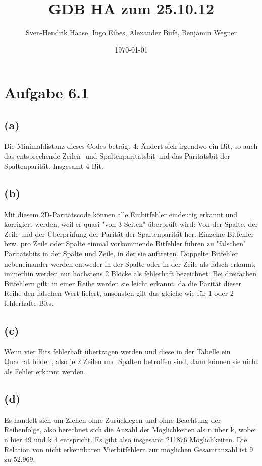 \documentclass[12pt]{article}
\author{Sven-Hendrik Haase, Ingo Eibes, Alexander Bufe, Benjamin Wegner}
\title{GDB HA zum 25.10.12}
\date{\today}
\begin{document}
\setcounter{secnumdepth}{0}
\maketitle

\section{Aufgabe 6.1}
\subsection{(a)}
Die Minimaldistanz dieses Codes beträgt 4:
Ändert sich irgendwo ein Bit, so auch das entsprechende Zeilen-
und Spaltenparitätsbit und das Paritätsbit der Spaltenparität.
Insgesamt 4 Bit.

\subsection{(b)}
Mit diesem 2D-Paritätscode können alle Einbitfehler eindeutig
erkannt und korrigiert werden, weil er quasi "von 3 Seiten"
überprüft wird:
Von der Spalte, der Zeile und der Überprüfung der
Parität der Spaltenparität her.
Einzelne Bitfehler bzw. pro Zeile oder Spalte einmal vorkommende 
Bitfehler führen zu "falschen" Paritätsbits in der Spalte und Zeile,
in der sie auftreten.
Doppelte Bitfehler nebeneinander werden entweder in der Spalte
oder in der Zeile als falsch erkannt; immerhin werden nur
höchstens 2 Blöcke als fehlerhaft bezeichnet.
Bei dreifachen Bitfehlern gilt: in einer Reihe werden sie leicht
erkannt, da die Parität dieser Reihe den falschen Wert liefert,
ansonsten gilt das gleiche wie für 1 oder 2 fehlerhafte Bits.

\subsection{(c)}
Wenn vier Bits fehlerhaft übertragen werden und diese in
der Tabelle ein Quadrat bilden, also je 2 Zeilen und Spalten
betroffen sind, dann können sie nicht als Fehler erkannt werden.

\subsection{(d)}
Es handelt sich um Ziehen ohne Zurücklegen und ohne
Beachtung der Reihenfolge, also berechnet sich die Anzahl
der Möglichkeiten als n über k, wobei n hier 49
und k 4 entspricht.
Es gibt also insgesamt 211876 Möglichkeiten.
Die Relation von nicht erkennbaren Vierbitfehlern zur möglichen
Gesamtanzahl ist 9 zu 52.969.
\end{document}
